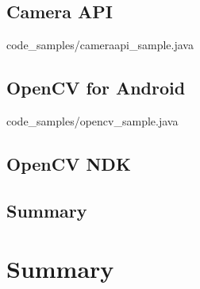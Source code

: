 \documentclass[openany]{mgr} %
\begin{document}

\section{Camera API}


{code_samples/cameraapi_sample.java}

\section{OpenCV for Android}


{code_samples/opencv_sample.java}


\section{OpenCV NDK}

\section{Summary}

\chapter{Summary}
\end{document}
